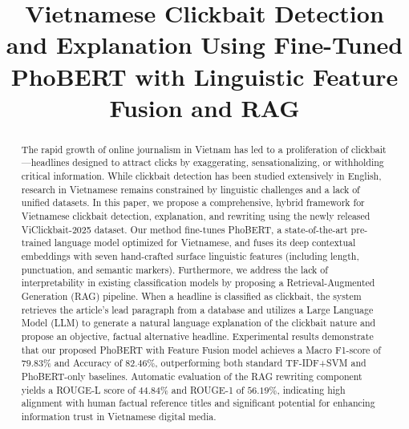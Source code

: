 \documentclass[conference]{IEEEtran}
\begin{document}
\title{Vietnamese Clickbait Detection and Explanation Using Fine-Tuned PhoBERT with Linguistic Feature Fusion and RAG\\
}

\author{
\and
{}
}

\maketitle

\begin{abstract}
The rapid growth of online journalism in Vietnam has led to a proliferation of clickbait—headlines designed to attract clicks by exaggerating, sensationalizing, or withholding critical information. While clickbait detection has been studied extensively in English, research in Vietnamese remains constrained by linguistic challenges and a lack of unified datasets. In this paper, we propose a comprehensive, hybrid framework for Vietnamese clickbait detection, explanation, and rewriting using the newly released ViClickbait-2025 dataset. Our method fine-tunes PhoBERT, a state-of-the-art pre-trained language model optimized for Vietnamese, and fuses its deep contextual embeddings with seven hand-crafted surface linguistic features (including length, punctuation, and semantic markers). Furthermore, we address the lack of interpretability in existing classification models by proposing a Retrieval-Augmented Generation (RAG) pipeline. When a headline is classified as clickbait, the system retrieves the article's lead paragraph from a database and utilizes a Large Language Model (LLM) to generate a natural language explanation of the clickbait nature and propose an objective, factual alternative headline. Experimental results demonstrate that our proposed PhoBERT with Feature Fusion model achieves a Macro F1-score of $79.83\%$ and Accuracy of $82.46\%$, outperforming both standard TF-IDF+SVM and PhoBERT-only baselines. Automatic evaluation of the RAG rewriting component yields a ROUGE-L score of $44.84\%$ and ROUGE-1 of $56.19\%$, indicating high alignment with human factual reference titles and significant potential for enhancing information trust in Vietnamese digital media.
\end{abstract}
\end{document}
